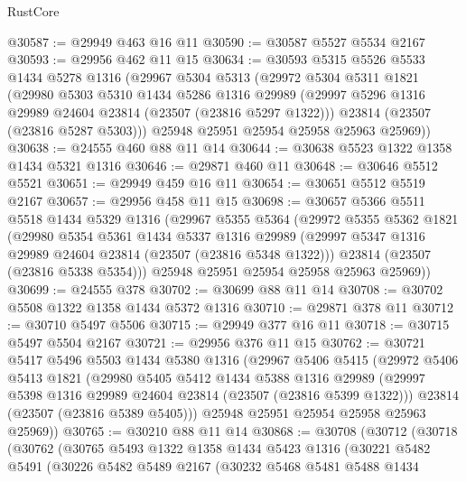 \begin{lexlean}{RustCore}
\begin{coremodule}
@30587 := @29949 @463 @16 @11
@30590 := @30587 @5527 @5534 @2167
@30593 := @29956 @462 @11 @15
@30634 := @30593
    @5315
    @5526
    @5533
    @1434
    @5278
    @1316
    (@29967
      @5304
      @5313
      (@29972
        @5304
        @5311
        @1821
        (@29980
          @5303
          @5310
          @1434
          @5286
          @1316
          @29989
          (@29997 @5296 @1316 @29989 @24604 @23814 (@23507 (@23816 @5297 @1322)))
          @23814
          (@23507 (@23816 @5287 @5303)))
        @25948
        @25951
        @25954
        @25958
        @25963
        @25969))
@30638 := @24555 @460 @88 @11 @14
@30644 := @30638 @5523 @1322 @1358 @1434 @5321 @1316
@30646 := @29871 @460 @11
@30648 := @30646 @5512 @5521
@30651 := @29949 @459 @16 @11
@30654 := @30651 @5512 @5519 @2167
@30657 := @29956 @458 @11 @15
@30698 := @30657
    @5366
    @5511
    @5518
    @1434
    @5329
    @1316
    (@29967
      @5355
      @5364
      (@29972
        @5355
        @5362
        @1821
        (@29980
          @5354
          @5361
          @1434
          @5337
          @1316
          @29989
          (@29997 @5347 @1316 @29989 @24604 @23814 (@23507 (@23816 @5348 @1322)))
          @23814
          (@23507 (@23816 @5338 @5354)))
        @25948
        @25951
        @25954
        @25958
        @25963
        @25969))
@30699 := @24555 @378
@30702 := @30699 @88 @11 @14
@30708 := @30702 @5508 @1322 @1358 @1434 @5372 @1316
@30710 := @29871 @378 @11
@30712 := @30710 @5497 @5506
@30715 := @29949 @377 @16 @11
@30718 := @30715 @5497 @5504 @2167
@30721 := @29956 @376 @11 @15
@30762 := @30721
    @5417
    @5496
    @5503
    @1434
    @5380
    @1316
    (@29967
      @5406
      @5415
      (@29972
        @5406
        @5413
        @1821
        (@29980
          @5405
          @5412
          @1434
          @5388
          @1316
          @29989
          (@29997 @5398 @1316 @29989 @24604 @23814 (@23507 (@23816 @5399 @1322)))
          @23814
          (@23507 (@23816 @5389 @5405)))
        @25948
        @25951
        @25954
        @25958
        @25963
        @25969))
@30765 := @30210 @88 @11 @14
@30868 := @30708
    (@30712
      (@30718
        (@30762
          (@30765
            @5493
            @1322
            @1358
            @1434
            @5423
            @1316
            (@30221
              @5482
              @5491
              (@30226
                @5482
                @5489
                @2167
                (@30232
                  @5468
                  @5481
                  @5488
                  @1434

\end{coremodule}
\end{lexlean}
